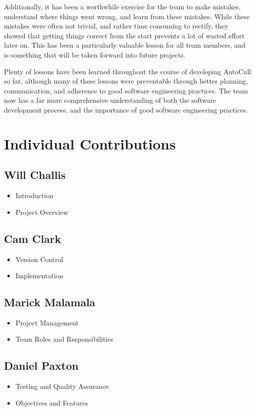 \documentclass[conference]{IEEEtran}
\begin{document}
Additionally, it has been a worthwhile exercise for the team to make mistakes, understand where things went wrong, and learn from these mistakes. While these mistakes were often not trivial, and rather time consuming to rectify, they showed that getting things correct from the start prevents a lot of wasted effort later on. This has been a particularly valuable lesson for all team members, and is something that will be taken forward into future projects.

Plenty of lessons have been learned throughout the course of developing AutoCull so far, although many of these lessons were preventable through better planning, communication, and adherence to good software engineering practices. The team now has a far more comprehensive understanding of both the software development process, and the importance of good software engineering practices. 

\section{Individual Contributions}
\subsection{Will Challis}
\begin{itemize}
    \item Introduction
    \item Project Overview
\end{itemize}
\subsection{Cam Clark}
\begin{itemize}
    \item Version Control
    \item Implementation
\end{itemize}
\subsection{Marick Malamala}
\begin{itemize}
    \item Project Management
    \item Team Roles and Responsibilities
\end{itemize}
\subsection{Daniel Paxton}
\begin{itemize}
    \item Testing and Quality Assurance
    \item Objectives and Features
\end{itemize}
\end{document}
